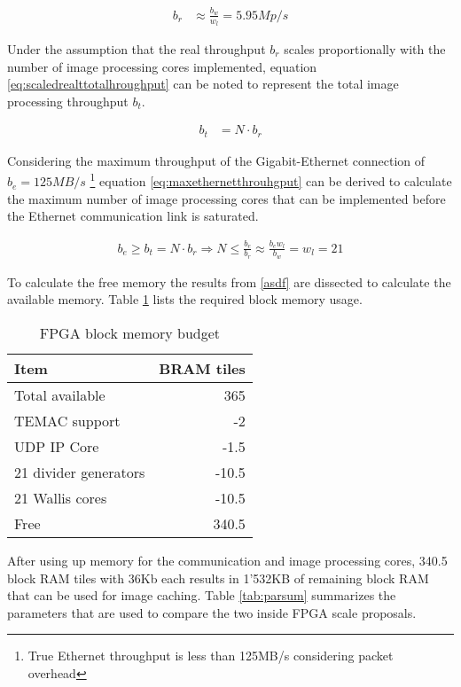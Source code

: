 \begin{align}
    b_r  & \approx \frac{b_w}{w_l} = 5.95 Mp/s
    \label{eq:vhdlwallismaxb}
\end{align}

Under the assumption that the real throughput $b_r$ scales proportionally with the
number of image processing cores implemented, equation 
\ref{eq:scaledrealttotalhroughput} can be noted to represent the total image
processing throughput $b_t$.

\begin{align}
    b_t  & = N \cdot b_r
    \label{eq:scaledrealttotalhroughput}
\end{align}

Considering the maximum throughput of the Gigabit-Ethernet connection of
$b_e=125MB/s$ \footnote{True Ethernet throughput is less than 125MB/s
considering packet overhead} equation \ref{eq:maxethernetthrouhgput} can be derived to calculate the
maximum number of image processing cores that can be implemented before the
Ethernet communication link is saturated.

\begin{align}
    b_e \geq b_t = N \cdot b_r \Rightarrow N \leq \frac{b_e}{b_r} \approx 
    \frac{b_e w_l}{b_w} = w_l = 21
    \label{eq:maxethernetthrouhgput}
\end{align}

To calculate the free memory the results from \ref{asdf}  are dissected to calculate the available memory. Table \ref{tab:membudget}
lists the required block memory usage.

\begin{table}[h!]
    \centering
    \begin{tabular}{l r}
        \toprule
        Item & BRAM tiles \\
        \midrule
        Total available & 365 \\
        TEMAC support & -2 \\
        UDP IP Core & -1.5 \\
        21 divider generators & -10.5 \\
        21 Wallis cores & -10.5 \\
        \midrule
        Free & 340.5\\
        \bottomrule
    \end{tabular}
    \caption{FPGA block memory budget}
    \label{tab:membudget}
\end{table}

After using up memory for the communication and image processing cores, 340.5
block RAM tiles with 36Kb each results in 1'532KB of remaining block RAM that
can be used for image caching. Table \ref{tab:parsum} summarizes the
parameters that are used to compare the two inside FPGA scale proposals.

